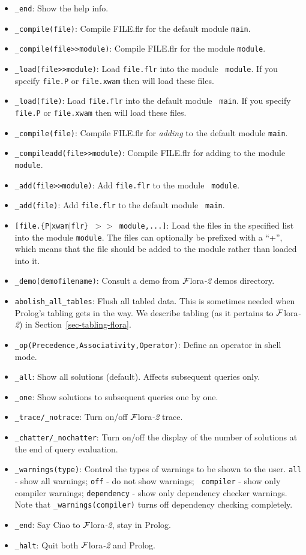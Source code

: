 \documentclass[11pt]{article}
\newcommand{\FLORA}{{\mbox{\sc ${\cal F}${lora}\rm\emph{-2}}}\xspace}
\newcommand{\ofile}{xwam}
\begin{document}
\begin{itemize}
\item {\tt \_end}:
    Show the help info.
\item {\tt \_compile(file)}:
    Compile FILE.flr for the default module {\tt main}.
\item {\tt \_compile(file>>module)}:
    Compile FILE.flr for the module {\tt module}.
  \item {\tt \_load(file>>module)}: Load {\tt file.flr} into the module {\tt
      module}. If you specify {\tt file.P} or {\tt file.\ofile} then will load
    these files.
  \item {\tt \_load(file)}: Load {\tt file.flr} into the default module {\tt
      main}. If you specify {\tt file.P} or {\tt file.\ofile} then will load
    these files.
\item {\tt \_compile(file)}:
    Compile FILE.flr for \emph{adding} to the default module {\tt main}.
\item {\tt \_compileadd(file>>module)}:
    Compile FILE.flr for adding to the module {\tt module}.
  \item {\tt \_add(file>>module)}: Add {\tt file.flr} to the module {\tt
      module}.
  \item {\tt \_add(file)}: Add {\tt file.flr} to the default module {\tt
      main}. 
\item {\tt [file.\{P$|$\ofile$|$flr\} $>>$ module,...]}:
    Load the files in the specified list into the module {\tt module}.
    The files can optionally be prefixed with a ``+'', which means that the
    file should be added to the module rather than loaded into it.
\item {\tt \_demo(demofilename)}:
    Consult a demo from \FLORA demos directory.
\item {\tt abolish\_all\_tables}:
    Flush all tabled data. This is sometimes needed when Prolog's tabling 
    gets in the way. We describe tabling (as it pertains to \FLORA) in
    Section~\ref{sec-tabling-flora}.
\item {\tt \_op(Precedence,Associativity,Operator)}:
    Define an operator in shell mode.
\item {\tt \_all}:
    Show all solutions (default). Affects subsequent queries only.
\item {\tt \_one}:
    Show solutions to subsequent queries one by one.
\item {\tt \_trace/\_notrace}:
    Turn on/off \FLORA trace.
\item {\tt \_chatter/\_nochatter}:
  Turn on/off the display of the number of solutions at the end of query
  evaluation.
\item {\tt \_warnings(type)}:
  Control the types of warnings to be shown to the user.
  {\tt all} - show all warnings; {\tt off} - do not show warnings; {\tt
    compiler} - show only compiler warnings; {\tt dependency} - show only
  dependency checker warnings. Note that {\tt \_warnings(compiler)}
  turns off dependency checking completely.
\item {\tt \_end}:
    Say Ciao to \FLORA, stay in Prolog.
\item {\tt \_halt}:
    Quit both \FLORA and Prolog.
\end{itemize}
\end{document}
